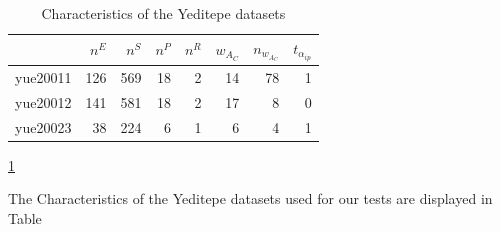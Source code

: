 \documentclass[a4paper, french, 8pt]{report}
\begin{document}
\begin{table}[h]
 \begin{center}
    \caption{Characteristics of the Yeditepe datasets}
    \label{tableau2}
    \begin{tabular}{r|r r r r||r r||r}
       & \textit{$n^E$} & \textit{$n^S$} & \textit{$n^P$} & \textit{$n^R$} &\textit{$w_{A_C}$} & \textit{$n_{w_{A_C}}$} & $t_{\alpha _{ip}}$\\ 
        \hline
    yue20011 & 126 & 569 & 18 & 2 & 14 & 78 & 1\\
    yue20012 & 141 & 581 & 18 & 2 & 17 & 8 & 0\\
    yue20023 & 38 & 224 & 6 & 1 & 6 & 4 & 1\\
 \end{tabular}
 \end{center}
 \ref{tableau2}
\end{table}
The Characteristics of the Yeditepe datasets used for our tests are displayed in Table 



%
%

\end{document}
